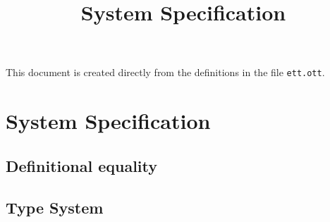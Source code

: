 \documentclass{article}
\title{System Specification}
\begin{document}
\maketitle

This document is created directly from the definitions in the file
{\texttt{ett.ott}}.

\section{System Specification}



\subsection{Definitional equality}

\subsection{Type System}
\end{document}
